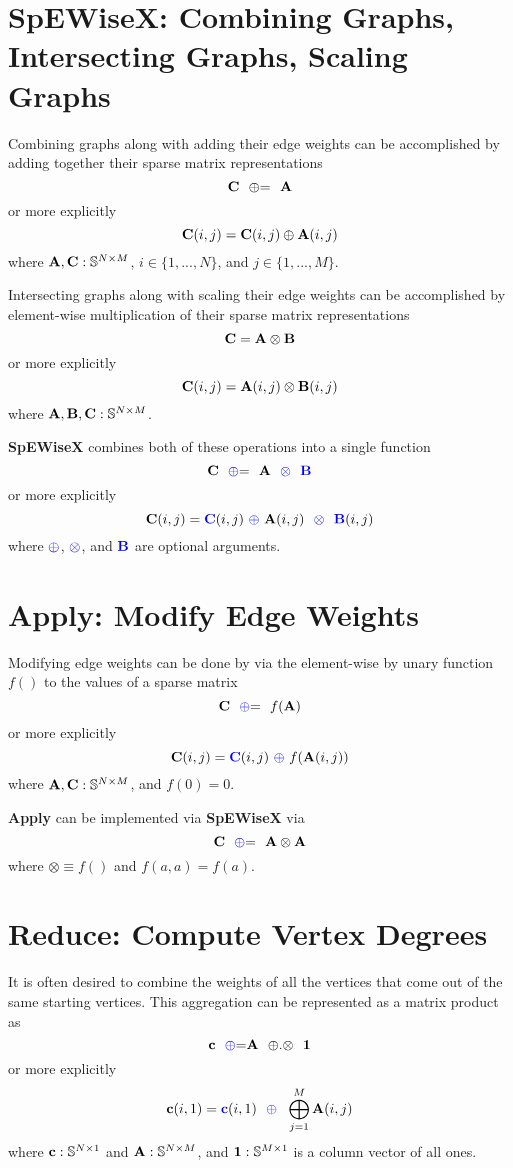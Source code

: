 \section{SpEWiseX: Combining Graphs, Intersecting Graphs, Scaling Graphs}
  Combining graphs along with adding their edge weights can be accomplished by adding together their sparse matrix representations
$$
   {\bf C} ~~ {\oplus}{=} ~~ {\bf A}
$$
or more explicitly
$$
   {\bf C}(i,j) = {\bf C}(i,j) \oplus {\bf A}(i,j)
$$
where ${\bf A},{\bf C}: \mathbb{S}^{N \times M}$, $i \in \{1,...,N\}$, and $j \in \{1,...,M\}$.

  Intersecting graphs along with scaling their edge weights can be accomplished by element-wise multiplication of their sparse matrix representations
$$
   {\bf C} = {\bf A} \otimes {\bf B}
$$
or more explicitly
$$
   {\bf C}(i,j) = {\bf A}(i,j) \otimes {\bf B}(i,j)
$$
where ${\bf A},{\bf B},{\bf C}: \mathbb{S}^{N \times M}$.

  {\bf SpEWiseX} combines both of these operations into a single function
$$
   {\bf C} ~~ {\textcolor{blue}{\oplus}}{=} ~~ {\bf A} ~~ {\textcolor{blue}{\otimes}} ~~ {\textcolor{blue}{\bf B}}
$$
or more explicitly
$$
   {\bf C}(i,j) = {\textcolor{blue}{\bf C}}(i,j) ~ {\textcolor{blue}{\oplus}} ~ {\bf A}(i,j) ~~ {\textcolor{blue}{\otimes}} ~~ {\textcolor{blue}{\bf B}}(i,j)
$$
where ${\textcolor{blue}{\oplus}}$, ${\textcolor{blue}{\otimes}}$, and ${\textcolor{blue}{\bf B}}$ are optional arguments. 

\section{Apply: Modify Edge Weights}
  Modifying edge weights can be done by via the element-wise by unary function $f()$ to the values of a sparse matrix
$$
   {\bf C} ~~ {\textcolor{blue}{\oplus}}{=} ~~ f({\bf A})
$$
or more explicitly
$$
   {\bf C}(i,j) = {\textcolor{blue}{\bf C}}(i,j) ~ {\textcolor{blue}{\oplus}} ~f({\bf A}(i,j))
$$
where ${\bf A},{\bf C}: \mathbb{S}^{N \times M}$, and $f(0) = 0$.

  {\bf Apply} can be implemented via {\bf SpEWiseX} via
$$
   {\bf C} ~~ {\textcolor{blue}{\oplus}}{=} ~~ {\bf A} \otimes {\bf A}
$$
where $\otimes \equiv f()$ and $f(a,a) = f(a)$.

\section{Reduce: Compute Vertex Degrees}
  It is often desired to combine the weights of all the vertices that come out of the same starting vertices.  This aggregation can be represented as a matrix product as
$$
   {\bf c} ~~ {\textcolor{blue}{\oplus}}{=} {\bf A} ~~ {\oplus}.{\otimes} ~~{\bf 1}
$$
or more explicitly
$$
   {\bf c}(i,1) = {\textcolor{blue}{\bf c}}(i,1) ~~ {\textcolor{blue}{\oplus}} ~~ \bigoplus_{j=1}^M {\bf A}(i,j)
$$
where ${\bf c}: \mathbb{S}^{N \times 1}$ and ${\bf A}: \mathbb{S}^{N \times M}$, and ${\bf 1}: \mathbb{S}^{M \times 1}$ is a column vector of all ones.

